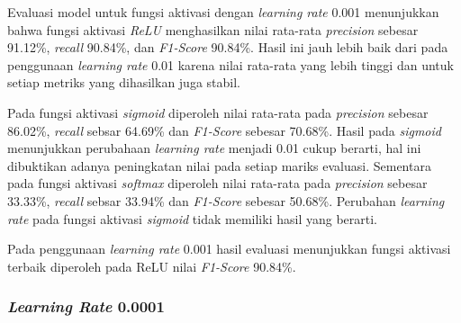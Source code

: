 \vspace{1cm}


    Evaluasi model untuk fungsi aktivasi dengan \textit{learning rate} 0.001 menunjukkan bahwa fungsi aktivasi \textit{ReLU} menghasilkan nilai rata-rata \textit{precision} sebesar 91.12\%, \textit{recall} 90.84\%, dan \textit{ F1-Score} 90.84\%. Hasil ini jauh lebih baik dari pada penggunaan \textit{learning rate} 0.01 karena nilai rata-rata yang lebih tinggi dan untuk setiap metriks yang dihasilkan juga stabil. 
    
     Pada fungsi aktivasi \textit{sigmoid} diperoleh nilai rata-rata pada \textit{precision} sebesar 86.02\%, \textit{recall} sebsar 64.69\% dan\textit{ F1-Score} sebesar 70.68\%. Hasil pada \textit{sigmoid} menunjukkan perubahaan \textit{learning rate} menjadi 0.01 cukup berarti, hal ini dibuktikan adanya peningkatan nilai pada setiap mariks evaluasi. Sementara pada fungsi aktivasi \textit{softmax} diperoleh nilai rata-rata pada \textit{precision} sebesar 33.33\%, \textit{recall} sebsar 33.94\% dan\textit{ F1-Score} sebesar 50.68\%.
     Perubahan \textit{learning rate} pada fungsi aktivasi \textit{sigmoid} tidak memiliki hasil yang berarti. 
     
     Pada penggunaan \textit{learning rate} 0.001 hasil evaluasi menunjukkan fungsi aktivasi terbaik diperoleh pada ReLU nilai \textit{ F1-Score} 90.84\%.
     
  

    

   \subsubsection{\textit{Learning Rate} 0.0001} 

